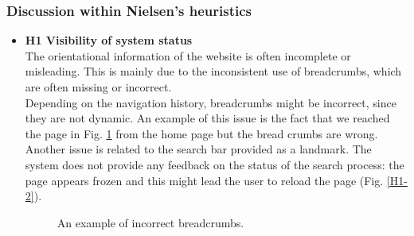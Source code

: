 \subsubsection{Discussion within Nielsen's heuristics}
\begin{itemize}
    \item \textbf{H1 Visibility of system status}\\
        The orientational information of the website is often incomplete or misleading. This is mainly due to the inconsistent use of breadcrumbs, which are often missing or incorrect.\\
        Depending on the navigation history, breadcrumbs might be incorrect, since they are not dynamic. An example of this issue is the fact that we reached the page in Fig. \ref{H1-1} from the home page but the bread crumbs are wrong.\\
        Another issue is related to the search bar provided as a landmark. The system does not provide any feedback on the status of the search process: the page appears frozen and this might lead the user to reload the page (Fig. \ref{H1-2}).\\
        \begin{figure}[!ht]
            \begin{minipage}{\linewidth}
                \centering
                \captionsetup{justification=centering}
                \caption{An example of incorrect breadcrumbs.}
                \label{H1-1}
            \end{minipage}
        \end{figure}
        \begin{figure}[!ht]
            \begin{minipage}{\linewidth}
                \centering

\end{minipage}
\end{figure}
\end{itemize}
